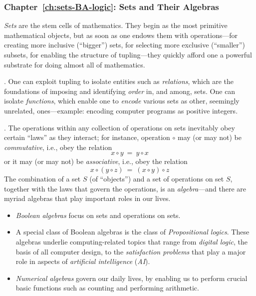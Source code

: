 \subsubsection{Chapter~\ref{ch:sets-BA-logic}: Sets and Their Algebras}

{\em Sets} are the stem cells of mathematics.  They begin as the most
primitive mathematical objects, but as soon as one endows them with
operations---for creating more inclusive (``bigger'') sets, for
selecting more exclusive (``smaller'') subsets, for enabling the
structure of tupling---they quickly afford one a powerful substrate
for doing almost all of mathematics.

\medskip

.
%
One can exploit tupling to isolate entities such as {\em relations},
which are the foundations of imposing and identifying {\em order} in,
and among, sets.  One can isolate {\em functions}, which enable one to
{\em encode} various sets as other, seemingly unrelated,
ones---example: encoding computer programs as positive integers.

\medskip

.
%
The operations within any collection of operations on sets inevitably
obey certain ``laws'' as they interact; for instance, operation
$\circ$ may (or may not) be {\em commutative}, i.e., obey the relation
\[ x \circ y \ = \ y \circ x \]
or it may (or may not) be {\em associative}, i.e., obey the relation
\[ x \circ (y \circ z) \ = \ (x \circ y) \circ z \]
The combination of a set $S$ (of ``objects'') and a set of operations
on set $S$, together with the laws that govern the operations, is an
{\em algebra}---and there are myriad algebras that play important
roles in our lives.
\begin{itemize}
\item
{\em Boolean algebras} focus on sets and operations on sets.
\item
A special class of Boolean algebras is the class of {\em Propositional
  logics}.  These algebras underlie computing-related topics that
range from {\em digital logic}, the basis of all computer design, to the
{\em satisfaction problems} that play a major role in aspects of
{\em artificial intelligence} ({\em AI}).
\item
{\em Numerical algebras} govern our daily lives, by enabling us to
perform crucial basic functions such as
counting and performing arithmetic.
\end{itemize}


